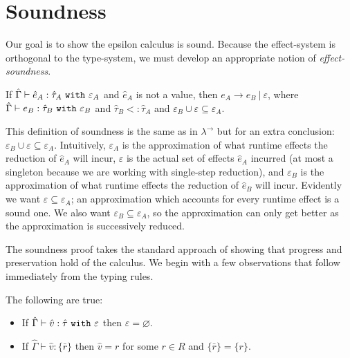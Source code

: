 \section{Soundness}

\noindent
Our goal is to show the epsilon calculus is sound. Because the effect-system is orthogonal to the type-system, we must develop an appropriate notion of \textit{effect-soundness}.

\begin{theorem}[Soundness]
If $\hat \Gamma \vdash \hat e_A: \hat \tau_A~\mathtt{with}~ \varepsilon_A$ and $\hat e_A$ is not a value, then $e_A \longrightarrow e_B~|~\varepsilon$, where $\hat \Gamma \vdash e_B: \hat \tau_B~\mathtt{with}~ \varepsilon_B$ and $\hat \tau_B <: \hat \tau_A$ and $\varepsilon_B \cup \varepsilon \subseteq \varepsilon_A$.
\end{theorem}

\noindent
This definition of soundness is the same as in $\lambda^{\rightarrow}$ but for an extra conclusion: $\varepsilon_B \cup \varepsilon \subseteq \varepsilon_A$. Intuitively, $\varepsilon_A$ is the approximation of what runtime effects the reduction of $\hat e_A$ will incur, $\varepsilon$ is the actual set of effects $\hat e_A$ incurred (at most a singleton because we are working with single-step reduction), and $\varepsilon_B$ is the approximation of what runtime effects the reduction of $\hat e_B$ will incur. Evidently we want $\varepsilon \subseteq \varepsilon_A$; an approximation which accounts for every runtime effect is a sound one. We also want $\varepsilon_B \subseteq \varepsilon_A$, so the approximation can only get better as the approximation is successively reduced.

The soundness proof takes the standard approach of showing that progress and preservation hold of the calculus. We begin with a few observations that follow immediately from the typing rules.

\begin{lemma}
The following are true:
\begin{itemize}
	\setlength\itemsep{-0.7em}
	\item If $\hat \Gamma \vdash \hat v: \hat \tau~\mathtt{with}~ \varepsilon$ then $\varepsilon = \varnothing$.
	\item If $\hat \Gamma \vdash \hat v: \{ \bar r \}$ then $\hat v = r$ for some $r \in R$ and $\{ \bar r \} = \{ r \}$.
\end{itemize}
\end{lemma}



